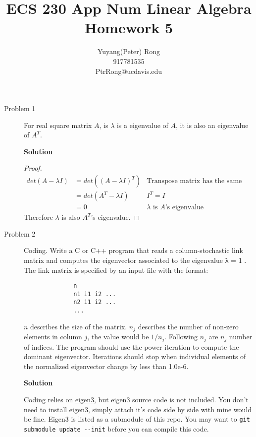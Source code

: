 \documentclass{article}
\title{ECS 230 App Num Linear Algebra \\ Homework 5}
\author{Yuyang(Peter) Rong \\917781535 \\ PtrRong@ucdavis.edu}
\begin{document}
\maketitle

\begin{description}



	\item[Problem 1] For real square matrix $A$, is $\lambda$ is a eigenvalue of $A$, it is also an eigenvalue of $A^T$.

	      \textbf{Solution}

	      \begin{proof}
		      \begin{align*}
			      det(A - \lambda I)
			       & = det((A - \lambda I)^T) & \text{Transpose matrix has the same determinant} & \\
			       & = det(A^T - \lambda I)   & \text{$I^T = I$}                                 & \\
			       & = 0                      & \text{$\lambda$ is $A$'s eigenvalue}
		      \end{align*}
		      Therefore $\lambda$ is also $A^T$'s eigenvalue.
	      \end{proof}



	\item[Problem 2] Coding.
	      Write a C or C++ program that reads a column-stochastic link matrix and computes the eigenvector associated to the eigenvalue λ = 1 .
	      The link matrix is specified by an input file with the format:
	      \begin{lstlisting}
			  n
			  n1 i1 i2 ...
			  n2 i1 i2 ...
			  ...
		  \end{lstlisting}

	      $n$ describes the size of the matrix.
	      $n_j$ describes the number of non-zero elements in column $j$, the value would be $1/n_j$.
	      Following $n_j$ are $n_j$ number of indices.
	      The program should use the power iteration to compute the dominant eigenvector.
	      Iterations should stop when individual elements of the normalized eigenvector change by less than 1.0e-6.

	      \textbf{Solution}

	      Coding relies on \href{http://eigen.tuxfamily.org/}{eigen3}, but eigen3 source code is not included.
	      You don't need to install eigen3, simply attach it's code side by side with mine would be fine.
	      Eigen3 is listed as a submodule of this repo.
	      You may want to \lstinline{git submodule update --init} before you can compile this code.




\end{description}
\end{document}
